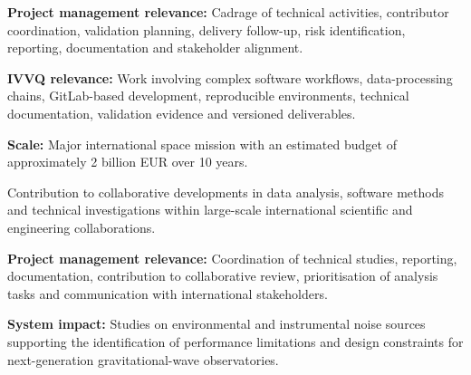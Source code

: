 \documentclass[8pt,a4paper,ragged2e,withhyper]{altacv}
\begin{document}
\textbf{Project management relevance:} Cadrage of technical activities, contributor coordination, validation planning, delivery follow-up, risk identification, reporting, documentation and stakeholder alignment.

\textbf{IVVQ relevance:} Work involving complex software workflows, data-processing chains, GitLab-based development, reproducible environments, technical documentation, validation evidence and versioned deliverables.

\textbf{Scale:} Major international space mission with an estimated budget of approximately 2 billion EUR over 10 years.

\divider


Contribution to collaborative developments in data analysis, software methods and technical investigations within large-scale international scientific and engineering collaborations.

\textbf{Project management relevance:} Coordination of technical studies, reporting, documentation, contribution to collaborative review, prioritisation of analysis tasks and communication with international stakeholders.

\textbf{System impact:} Studies on environmental and instrumental noise sources supporting the identification of performance limitations and design constraints for next-generation gravitational-wave observatories.


\vspace{-.3cm}


{\small
{}
}

\divider\smallskip
\vspace{-.3cm}

\end{document}
